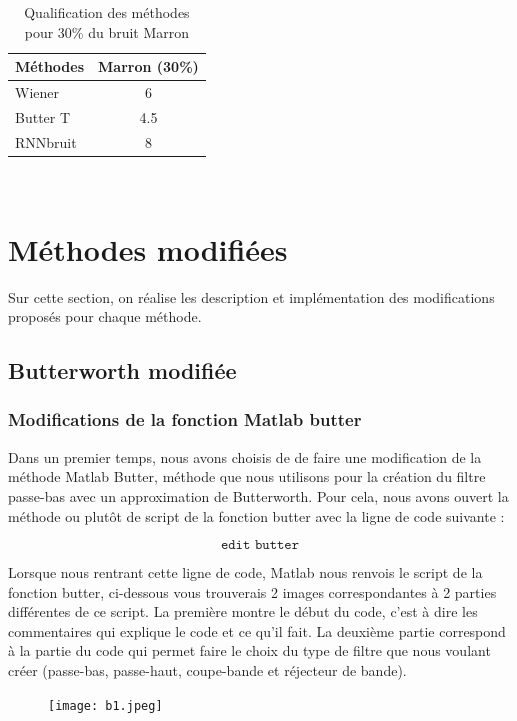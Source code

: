 \documentclass[conference,onecolumn]{IEEEtran}
\begin{document}
\begin{table}[H]
    \centering
    \begin{tabular}{ l  c }
    \textbf{Méthodes} & \textbf{Marron (30\%)} \\
    \hline
    Wiener & 6  \\
    Butter T &  4.5 \\
    RNNbruit & 8 \\
    \end{tabular}
    \caption{Qualification des méthodes pour 30\% du bruit Marron}
    \label{table:t6}
\end{table}
\hfill \\


\newpage

\section{Méthodes modifiées}
Sur cette section, on réalise les description et implémentation des modifications proposés pour chaque méthode. 

\subsection{\textbf{Butterworth modifiée}}

\subsubsection{Modifications de la fonction Matlab butter}

Dans un premier temps, nous avons choisis de de faire une modification de la méthode Matlab Butter, méthode que nous utilisons pour la création du filtre passe-bas avec un approximation de Butterworth. Pour cela, nous avons ouvert la méthode ou plutôt de script de la fonction butter avec la ligne de code suivante :

\[ \texttt{edit butter}\]

Lorsque nous rentrant cette ligne de code, Matlab nous renvois le script de la fonction butter, ci-dessous vous trouverais 2 images correspondantes à 2 parties différentes de ce script. La première montre le début du code, c'est à dire les commentaires qui explique le code et ce qu'il fait. La deuxième partie correspond à la partie du code qui permet faire le choix du type de filtre que nous voulant créer (passe-bas, passe-haut, coupe-bande et réjecteur de bande).

 \begin{figure}[H]
 \centering
    \texttt{[image: b1.jpeg]}
\end{figure}
\end{document}
